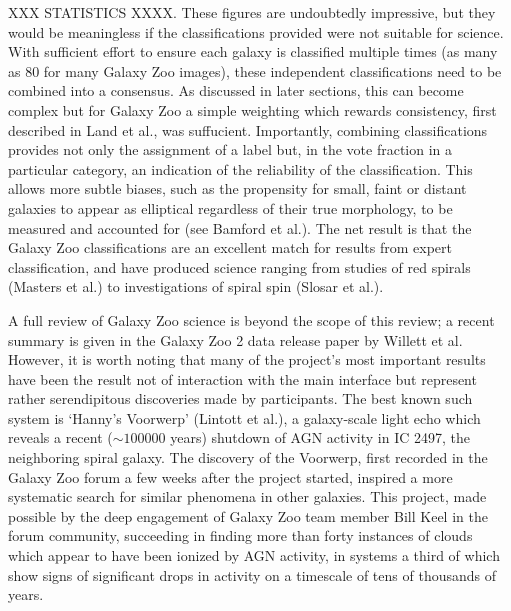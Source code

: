 \documentclass{ar2e}
\begin{document}
\begin{itemize}
XXX STATISTICS XXXX. These figures are undoubtedly impressive, but they would be meaningless if the classifications provided were not suitable for science. With sufficient effort to ensure each galaxy is classified multiple times (as many as 80 for many Galaxy Zoo images), these independent classifications need to be combined into a consensus. As discussed in later sections, this can become complex but for Galaxy Zoo a simple weighting which rewards consistency, first described in Land et al., was suffucient. Importantly, combining classifications provides not only the assignment of a label but, in the vote fraction in a particular category, an indication of the reliability of the classification. This allows more subtle biases, such as the propensity for small, faint or distant galaxies to appear as elliptical regardless of their true morphology, to be measured and accounted for (see Bamford et al.). The net result is that the Galaxy Zoo classifications are an excellent match for results from expert classification, and have produced science ranging from studies of red spirals (Masters et al.) to investigations of spiral spin (Slosar et al.).

A full review of Galaxy Zoo science is beyond the scope of this review; a recent summary is given in the Galaxy Zoo 2 data release paper by Willett et al. However, it is worth noting that many of the project's most important results have been the result not of interaction with the main interface but represent rather serendipitous discoveries made by participants. The best known such system is `Hanny's Voorwerp' (Lintott et al.), a galaxy-scale light echo which reveals a recent ($\sim 100000$ years) shutdown of AGN activity in IC 2497, the neighboring spiral galaxy. The discovery of the Voorwerp, first recorded in the Galaxy Zoo forum a few weeks after the project started, inspired a more systematic search for similar phenomena in other galaxies. This project, made possible by the deep engagement of Galaxy Zoo team member Bill Keel in the forum community, succeeding in finding more than forty instances of clouds which appear to have been ionized by AGN activity, in systems a third of which show signs of significant drops in activity on a timescale of tens of thousands of years. 


\end{itemize}
\end{document}
